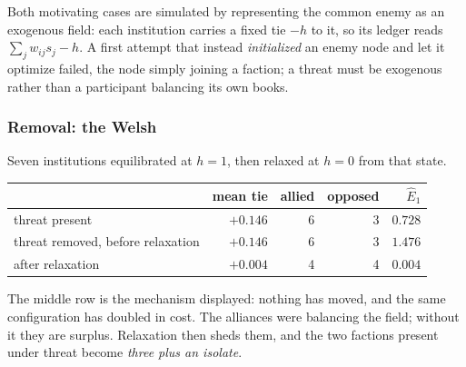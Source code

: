 \documentclass[11pt]{article}
\numberwithin{equation}{section}
\theoremstyle{plain}
\theoremstyle{definition}
\theoremstyle{remark}
\begin{document}
Both motivating cases are simulated by representing the common enemy as
an exogenous field: each institution carries a fixed tie $-h$ to it, so
its ledger reads $\sum_j w_{ij}s_j-h$. A first attempt that instead
\emph{initialized} an enemy node and let it optimize failed, the node
simply joining a faction; a threat must be exogenous rather than a
participant balancing its own books.

\subsubsection{Removal: the Welsh}\label{ad:subsub:welsh}

Seven institutions equilibrated at $h=1$, then relaxed at $h=0$ from
that state.

\begin{center}\small
\begin{tabular}{@{}lrrrr@{}}
\toprule
& mean tie & allied & opposed & $\hat E_1$\\
\midrule
threat present & $+0.146$ & 6 & 3 & $0.728$\\
threat removed, before relaxation & $+0.146$ & 6 & 3 & $1.476$\\
after relaxation & $+0.004$ & 4 & 4 & $0.004$\\
\bottomrule
\end{tabular}
\end{center}

The middle row is the mechanism displayed: nothing has moved, and the
same configuration has doubled in cost. The alliances were balancing the
field; without it they are surplus. Relaxation then sheds them, and the
two factions present under threat become \emph{three plus an isolate}.
\end{document}
